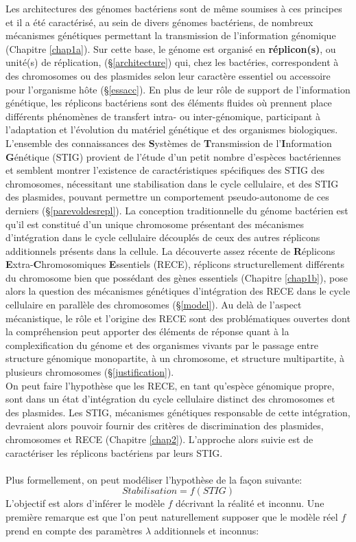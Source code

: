 Les architectures des génomes bactériens sont de même soumises à ces principes et il a été caractérisé, au sein de divers génomes bactériens, de nombreux mécanismes génétiques permettant la transmission de l'information génomique (Chapitre \ref{chap1a}). Sur cette base, le génome est organisé en \textbf{réplicon(s)}, ou unité(s) de réplication, (\S \ref{architecture}) qui, chez les bactéries,  correspondent à des chromosomes ou des plasmides selon leur caractère essentiel ou accessoire pour l'organisme hôte (\S \ref{essacc}). En plus de leur rôle de support de l'information génétique, les réplicons bactériens sont des éléments fluides où prennent place différents phénomènes de transfert intra- ou inter-génomique, participant à l'adaptation et l'évolution du matériel génétique et des organismes biologiques. \\
L'ensemble des connaissances des \textbf{S}ystèmes de \textbf{T}ransmission de l'\textbf{I}nformation \textbf{G}énétique (STIG) provient de l'étude d'un petit nombre d'espèces bactériennes et semblent montrer l'existence de caractéristiques spécifiques des STIG des chromosomes, nécessitant une stabilisation dans le cycle cellulaire, et des STIG des plasmides, pouvant permettre un comportement pseudo-autonome de ces derniers (\S \ref{parevoldesrepl}). La conception traditionnelle du génome bactérien est qu'il est constitué d'un unique chromosome présentant des mécanismes d'intégration dans le cycle cellulaire découplés de ceux des autres réplicons additionnels présents dans la cellule. La découverte assez récente de \textbf{R}éplicons \textbf{E}xtra-\textbf{C}hromosomiques \textbf{E}ssentiels (RECE), réplicons structurellement différents du chromosome bien que possédant des gènes essentiels (Chapitre \ref{chap1b}), pose alors la question des mécanismes génétiques d'intégration des RECE dans le cycle cellulaire en parallèle des chromosomes (\S\ref{model}). Au delà de l'aspect mécanistique, le rôle et l'origine des RECE sont des problématiques ouvertes dont la compréhension peut apporter des éléments de réponse quant à la complexification du génome et des organismes vivants par le passage entre structure génomique monopartite, à un chromosome, et  structure multipartite, à plusieurs chromosomes (\S\ref{justification}).\\
On peut faire l'hypothèse que les RECE, en tant qu'espèce génomique propre, sont dans un état d'intégration du cycle cellulaire distinct des chromosomes et des plasmides. Les STIG, mécanismes génétiques responsable de cette intégration, devraient alors pouvoir fournir des critères de discrimination des plasmides, chromosomes et RECE (Chapitre \ref{chap2}). L'approche alors suivie est de caractériser les réplicons bactériens par leurs STIG. 
\\
\\
Plus formellement, on peut modéliser l'hypothèse de la façon suivante:
$$
Stabilisation = f(STIG)
$$
L'objectif est alors d'inférer le modèle $f$ décrivant la réalité et inconnu. Une première remarque est que l'on peut naturellement supposer que le modèle réel $f$ prend en compte des paramètres $\lambda$ additionnels et inconnus: 

